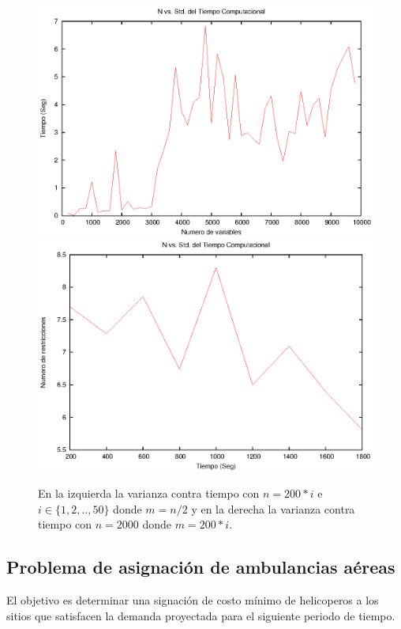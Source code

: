 \begin{figure}[h]
\center
\includegraphics[scale=0.6]{img/Varianza_Tiempo_1.eps}
%
\includegraphics[scale=0.6]{img/Varianza_Tiempo_2.eps}
\caption{En la izquierda la varianza contra tiempo con $n=200*i$ e $i \in \{1,2,..,50 \}$ donde $m=n/2$ y en la derecha la varianza contra tiempo con $n=2000$ donde $m=200*i$.}
\end{figure}

\subsection{Problema de asignación de ambulancias aéreas}
El objetivo es determinar una signación de costo mínimo de helicoperos a los sitios que satisfacen la demanda proyectada para el siguiente periodo de tiempo.
%
